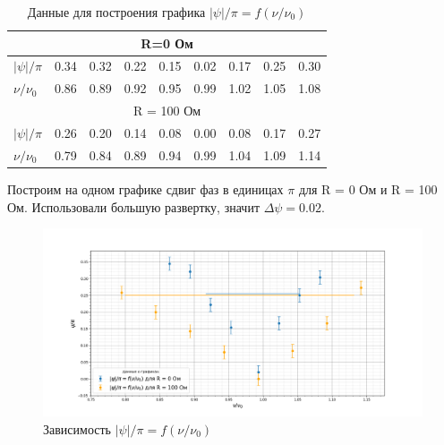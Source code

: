 \documentclass[a4paper, 12pt]{article}%
\begin{document}
	\begin{table}[H]
		\centering
		\begin{tabular}{|lcccccccc|}
			\hline
			\multicolumn{9}{|c|}{R=0   Ом}                                                                                                                                                                                                           \\ \hline
			\multicolumn{1}{|l|}{$|\psi|/\pi$}  & \multicolumn{1}{c|}{0.34} & \multicolumn{1}{c|}{0.32} & \multicolumn{1}{c|}{0.22} & \multicolumn{1}{c|}{0.15} & \multicolumn{1}{c|}{0.02} & \multicolumn{1}{c|}{0.17} & \multicolumn{1}{c|}{0.25} & 0.30 \\ \hline
			\multicolumn{1}{|l|}{$\nu/\nu_0$} & \multicolumn{1}{c|}{0.86} & \multicolumn{1}{c|}{0.89} & \multicolumn{1}{c|}{0.92} & \multicolumn{1}{c|}{0.95} & \multicolumn{1}{c|}{0.99} & \multicolumn{1}{c|}{1.02} & \multicolumn{1}{c|}{1.05} & 1.08 \\ \hline
			\multicolumn{9}{|c|}{R = 100 Ом}                                                                                                                                                                                                         \\ \hline
			\multicolumn{1}{|l|}{$|\psi|/\pi$}  & \multicolumn{1}{c|}{0.26} & \multicolumn{1}{c|}{0.20} & \multicolumn{1}{c|}{0.14} & \multicolumn{1}{c|}{0.08} & \multicolumn{1}{c|}{0.00} & \multicolumn{1}{c|}{0.08} & \multicolumn{1}{c|}{0.17} & 0.27 \\ \hline
			\multicolumn{1}{|l|}{$\nu/\nu_0$} & \multicolumn{1}{c|}{0.79} & \multicolumn{1}{c|}{0.84} & \multicolumn{1}{c|}{0.89} & \multicolumn{1}{c|}{0.94} & \multicolumn{1}{c|}{0.99} & \multicolumn{1}{c|}{1.04} & \multicolumn{1}{c|}{1.09} & 1.14 \\ \hline
		\end{tabular}
	\caption{Данные для построения графика $|\psi|/\pi = f(\nu/\nu_0)$}
	\end{table}
	Построим на одном графике сдвиг фаз в единицах $\pi$ для R = 0 Ом и R = 100 Ом. Использовали большую развертку, значит $\Delta \psi = 0.02$.
	\begin{figure}[H]
		\centering
		\includegraphics[width=0.9\linewidth]{RLC}
		\caption{Зависимость $|\psi|/\pi = f(\nu/\nu_0)$}
		\label{fig:rlc}
	\end{figure}
	
\end{document}
